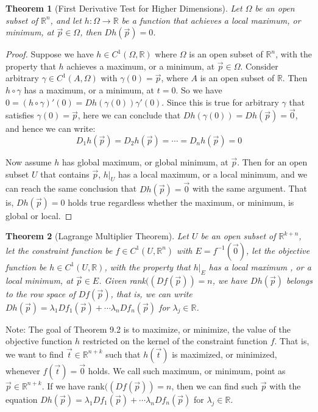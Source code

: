 \documentclass[15pt]{book}
\theoremstyle{break}
\theoremstyle{break}
\newtheorem{thm}{Theorem}[section]
\newcommand{\R}{\mathbb{R}}
\newcommand{\note}{\color{red}Note: \color{black}}
\begin{document}
\begin{thm}[First Derivative Test for Higher Dimensions]
Let $\Omega$ be an open subset of $\R^n$, and let $h: \Omega \to \R$ be a function that achieves a local maximum, or minimum, at $\vec{p}\in \Omega$, then $Dh(\vec{p}) = 0$.
\end{thm}
\begin{proof}
Suppose we have $h \in C^1(\Omega, \R)$ where $\Omega$ is an open subset of $\R^n$, with the property that $h$ achieves a maximum, or a minimum, at $\vec{p}\in \Omega$. Consider arbitrary $\gamma \in C^1(A, \Omega)$ with $\gamma(0) = \vec{p}$, where $A$ is an open subset of $\R$. Then $h\circ \gamma$ has a maximum, or a minimum, at $t=0$. So we have $0 = (h \circ \gamma)' (0) = Dh(\gamma(0))\gamma'(0)$. Since this is true for arbitrary $\gamma$ that satisfies $\gamma(0) = \vec{p}$, here we can conclude that $Dh(\gamma(0))=Dh(\vec{p}) = \vec{0}$, and hence we can write: 
$$D_1h(\vec{p}) = D_2h(\vec{p}) = \cdots  = D_nh(\vec{p}) = 0$$

Now assume $h$ has global maximum, or global minimum, at $\vec{p}$. Then for an open subset $U$ that contains $\vec{p}$, $h|_U$ has a local maximum, or a local minimum, and we can reach the same conclusion that $Dh(\vec{p}) = \vec{0}$ with the same argument. That is, $Dh(\vec{p}) = 0$ holds true regardless whether the maximum, or minimum, is global or local.
\end{proof}

\hfill\break
\begin{thm}[Lagrange Multiplier Theorem]
Let $U$ be an open subset of $\R^{k+n}$, let the constraint function be $f\in C^1(U,\R^n)$ with $E=f^{-1}(\vec{0})$, let the objective function be $h\in C^1(U,\R)$, with the property that $h|_E$ has a local maximum , or a local minimum, at $\vec{p}\in E$. Given rank$((Df(\vec{p})) = n$, we have $Dh(\vec{p})$ belongs to the row space of $Df(\vec{p})$, that is, we can write $Dh(\vec{p}) = \lambda_1 Df_1(\vec{p}) + \cdots \lambda_n Df_n(\vec{p})$ for $\lambda_j \in \R$.
\end{thm}

\note The goal of Theorem 9.2 is to maximize, or minimize, the value of the objective function $h$ restricted on the kernel of the constraint function $f$. That is, we want to find $\vec{t}\in \R^{n+k}$ such that $h(\vec{t})$ is maximized, or minimized, whenever $f(\vec{t}) = \vec{0}$ holds. We call such maximum, or minimum, point as $\vec{p}\in \R^{n+k}$. If we have rank$((Df(\vec{p})) = n$, then we can find such $\vec{p}$ with the equation $Dh(\vec{p}) = \lambda_1 Df_1(\vec{p}) + \cdots \lambda_n Df_n(\vec{p})$ for $\lambda_j \in \R$.
\end{document}
